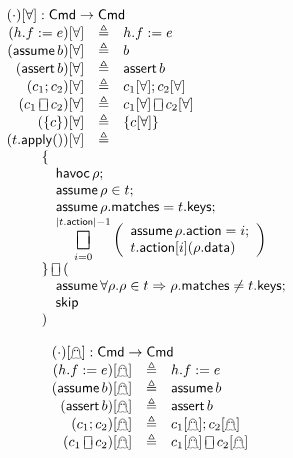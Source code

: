 \documentclass{article}
\newcommand{\Cmd}{\mathsf{Cmd}}
\newcommand{\matches}{\mathsf{matches}}
\newcommand{\action}{\mathsf{action}}
\newcommand{\keys}{\mathsf{keys}}
\newcommand{\data}{\mathsf{data}}
\newcommand{\assert}{\mathop{\mathsf{assert}}}
\newcommand{\assume}{\mathop{\mathsf{assume}}}
\newcommand{\apply}{\mathsf{apply}}
\newcommand{\choiceop}{\rotatebox[origin=c]{90}{$\sqsubset\!\!\!\sqsupset$}}
\newcommand{\choice}{\mathbin{\choiceop}}
\DeclareMathOperator*{\bigchoice}{\scalerel*{\choiceop}{\sum}}
\newcommand{\havoc}[1]{\mathop{\textsf{havoc}}#1}
\newcommand{\SKIP}{\mathsf{skip}}
\newcommand{\instr}{[\forall]}
\newcommand{\ginstr}{[\mathghost]}
\begin{document}
\begin{figure}[htp]
  \begin{minipage}[t]{0.5\textwidth}
  \[\begin{array}{r >{\triangleq}cl}
  \multicolumn{3}{l}{(\cdot)\instr : \Cmd \to \Cmd} \\
  (h.f := e)\instr && h.f := e \\
  (\assume b)\instr && b \\
  (\assert b)\instr && \assert b\\
  (c_1;c_2)\instr && c_1\instr;c_2\instr\\
  (c_1 \choice c_2)\instr && c_1\instr \choice c_2\instr\\
  (\{c\})\instr && \{c\instr\}\\
  (t.\apply())\instr && \\
  \multicolumn{3}{r}{
    \qquad
    \begin{array}[t]{l} \displaystyle
      \{ \\
      \quad \havoc \rho;\\
      \quad \assume \rho \in t; \\
      \quad \assume \rho.\matches = t.\keys; \\
      \quad \displaystyle \bigchoice_{i=0}^{|t.\action| -1}
      \left(\begin{array}{l}
        \assume \rho.\action = i;\\
        t.\action[i](\rho.\data)
      \end{array}\right)\\
      \} \choice ( \\
      \quad \assume \forall \rho. \rho \in t \Rightarrow \rho.\matches \neq t.\keys;\\
      \quad \SKIP \\
      )
    \end{array}}
  \end{array}
  \]
  \end{minipage}\begin{minipage}[t]{0.45\textwidth}
\[\begin{array}{r >{\triangleq}cl}
  \multicolumn{3}{l}{(\cdot)\ginstr : \Cmd \to \Cmd} \\
  (h.f := e)\ginstr && h.f := e \\
  (\assume b)\ginstr && \assume b \\
  (\assert b)\ginstr && \assert b\\
  (c_1;c_2)\ginstr && c_1\ginstr;c_2\ginstr\\
  (c_1 \choice c_2)\ginstr && c_1\ginstr \choice c_2\ginstr\\

\end{array}\]
\end{minipage}
\end{figure}
\end{document}
